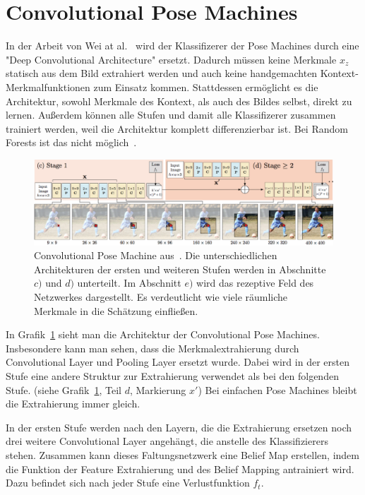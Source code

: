 \documentclass[journal, a4paper]{IEEEtran}
\begin{document}
\section{Convolutional Pose Machines}\label{subsec:Intro}
	In der Arbeit von Wei at al.~\cite{conv_pose} wird der Klassifizerer der Pose Machines durch eine "Deep Convolutional Architecture" ersetzt. Dadurch müssen keine Merkmale $x_z$ statisch aus dem Bild extrahiert werden und auch keine handgemachten Kontext-Merkmalfunktionen zum Einsatz kommen. Stattdessen ermöglicht es die Architektur, sowohl Merkmale des Kontext, als auch des Bildes selbst, direkt zu lernen. Außerdem können alle Stufen und damit alle Klassifizerer zusammen trainiert werden, weil die Architektur komplett differenzierbar ist. Bei Random Forests ist das nicht möglich~\cite{ramakrishna2014pose}.

        \begin{figure}[!bth]
                \begin{center}
                \includegraphics[width=1\columnwidth]{convolutional_pose_machine.png}
                \caption{Convolutional Pose Machine aus~\cite{conv_pose}. Die unterschiedlichen Architekturen der ersten und weiteren Stufen werden in Abschnitte $c)$ und $d)$ unterteilt. Im Abschnitt $e)$ wird das rezeptive Feld des Netzwerkes dargestellt. Es verdeutlicht wie viele räumliche Merkmale in die Schätzung einfließen.}
                \label{fig:conv_pose_machine}
                \end{center}
        \end{figure}

        In Grafik~\ref{fig:conv_pose_machine} sieht man die Architektur der Convolutional Pose Machines. Insbesondere kann man sehen, dass die Merkmalextrahierung durch Convolutional Layer und Pooling Layer ersetzt wurde. Dabei wird in der ersten Stufe eine andere Struktur zur Extrahierung verwendet als bei den folgenden Stufe. (siehe Grafik~\ref{fig:conv_pose_machine}, Teil $d$, Markierung $x'$) Bei einfachen Pose Machines bleibt die Extrahierung immer gleich. 

        In der ersten Stufe werden nach den Layern, die die Extrahierung ersetzen noch drei weitere Convolutional Layer angehängt, die anstelle des Klassifizierers stehen. Zusammen kann dieses Faltungsnetzwerk eine Belief Map erstellen, indem die Funktion der Feature Extrahierung und des Belief Mapping antrainiert wird. Dazu befindet sich nach jeder Stufe eine Verlustfunktion $f_{t}$.
\end{document}
